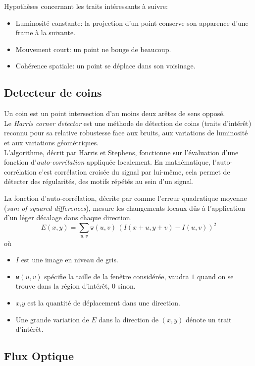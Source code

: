 \documentclass[a4paper,12pt]{report}
\begin{document}
Hypothèses concernant les traits intéressants à suivre:
\begin{itemize}
\item Luminosité constante: la projection d'un point conserve son apparence d'une frame à la suivante.
\item Mouvement court: un point ne bouge de beaucoup.
\item Cohérence spatiale: un point se déplace dans son voisinage.
\end{itemize}

\subsection{Detecteur de coins}
Un coin est un point intersection d'au moins deux arêtes de sens opposé.\\

Le \textit{Harris corner detector} est une méthode de détection de coins (traits d'intérêt) reconnu pour sa relative robustesse face aux bruits, aux variations de luminosité et aux variations géométriques. \\

L'algorithme, décrit par Harris et Stephens, fonctionne sur l'évaluation d'une fonction d'\textit{auto-corrélation} appliquée localement. 
En mathématique, l'auto-corrélation c'est corrélation croisée du signal par lui-même, cela permet de détecter des régularités, des motifs répétés au sein d'un signal.   

La fonction d'auto-corrélation, décrite par \cite{q} comme l'erreur quadratique moyenne (\textit{sum of squared differences}), mesure les changements locaux dûs à l'application d'un léger décalage dans chaque direction.\\
$$
E(x,y) = \sum_{u,v} \texttt{w}(u,v) \, \left( I(x+u,y+v) - I(u,v)\right)^2
$$
où
\begin{itemize}
\item[]$I$ est une image en niveau de gris.
\item[]$\texttt{w}(u,v)$ spécifie la taille de la fenêtre considérée, vaudra $1$ quand on se trouve dans la région d'intérêt, $0$ sinon.
\item[]$x$,$y$ est la quantité de déplacement dans une direction.
\item[]Une grande variation de $E$ dans la direction de $(x,y)$ dénote un trait d'intérêt.\\
\end{itemize}

\subsection{Flux Optique}
\end{document}
